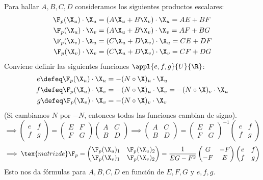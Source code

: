 Para hallar $A, B, C, D$ consideramos los siguientes productos escalares:
\[\begin{aligned}
		\F_p(\X_u) \cdot \X_u & = (A\X_u + B\X_v) \cdot \X_u = AE+BF \\
		\F_p(\X_u) \cdot \X_v & = (A\X_u + B\X_v) \cdot \X_v = AF+BG \\
		\F_p(\X_v) \cdot \X_u & = (C\X_u + D\X_v) \cdot \X_u = CE+DF \\
		\F_p(\X_v) \cdot \X_v & = (C\X_u + D\X_v) \cdot \X_v = CF+DG
	\end{aligned}\]
Conviene definir las siguientes funciones $\appl{e, f, g}{U}{\R}$:
\[\begin{aligned}
		e \defeq \F_p(\X_u) \cdot \X_u & = -(N\circ \X)_u \cdot \X_u                             \\
		f \defeq \F_p(\X_u) \cdot \X_v & = -(N\circ \X)_u \cdot \X_v = -(N\circ \X)_v \cdot \X_u \\
		g \defeq \F_p(\X_v) \cdot \X_v & = -(N\circ \X)_v \cdot \X_v
	\end{aligned}\]
(Si cambiamos $N$ por $-N$, entonces todas las funciones cambian de signo).
\[\implies \begin{pmatrix}
		e & f \\ f & g
	\end{pmatrix} = \begin{pmatrix}
		E & F \\ F & G
	\end{pmatrix} \begin{pmatrix}
		A & C \\ B & D
	\end{pmatrix}\implies \begin{pmatrix}
		A & C \\ B & D
	\end{pmatrix} = \begin{pmatrix}
		E & F \\ F & G
	\end{pmatrix}^{-1} \begin{pmatrix}
		e & f \\ f & g
	\end{pmatrix}\]
\[\implies \tex{matriz de } \F_p = \begin{pmatrix}
		\F_p(\X_u)_1 & \F_p(\X_u)_2 \\
		\F_p(\X_v)_1 & \F_p(\X_v)_2
	\end{pmatrix} = \frac{1}{EG-F^2} \begin{pmatrix}
		G & -F \\ -F & E
	\end{pmatrix} \begin{pmatrix}
		e & f \\ f & g
	\end{pmatrix}\]
Esto nos da fórmulas para $A, B, C, D$ en función de $E, F, G$ y $e, f, g$.

